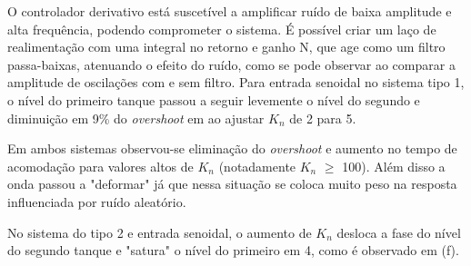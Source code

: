 O controlador derivativo está suscetível a amplificar ruído de baixa amplitude e alta frequência, podendo comprometer o sistema. É possível criar um laço de realimentação com uma integral no retorno e ganho N, que age como um filtro passa-baixas, atenuando o efeito do ruído, como se pode observar ao comparar a amplitude de oscilações com e sem filtro. Para entrada senoidal no sistema tipo 1, o nível do primeiro tanque passou a seguir levemente o nível do segundo e diminuição  em 9\% do \emph{overshoot} em ao ajustar $K_n$ de 2 para 5.

Em ambos sistemas observou-se eliminação do \emph{overshoot} e aumento no tempo de acomodação para valores altos de $K_n$ (notadamente $K_n$ $\geq$ 100). Além disso a onda passou a "deformar" já que nessa situação se coloca muito peso na resposta influenciada por ruído aleatório.

No sistema do tipo 2 e entrada senoidal, o aumento de $K_n$ desloca a fase do nível do segundo tanque e "satura" o nível do primeiro em 4, como é observado em (f).